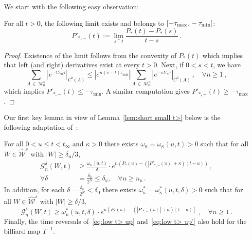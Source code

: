 \documentclass[AHL,Unicode,longabstracts,published]{cedram}
\newcommand{\cG}{\mathcal{G}}
\newcommand{\MM}{\mathcal{M}}
\newcommand{\cW}{\mathcal{W}}
\newcommand{\hW}{\widehat{\cW}}
\let\oldforall\forall
\renewcommand*{\forall}{\mathrel{\oldforall}}
\begin{document}
We start with the following easy observation:

\begin{lemm}\label{derP}
For all $t>0$,
the following limit exists and belongs to $ [-\tau_{\max},\newline-\tau_{\min}]$:
\[
P'_{*,-}(t):= \lim_{s \uparrow t} \frac{P_*(t)-P_*(s)}{t-s}\,.
\]
\end{lemm}

\begin{proof}
Existence of the limit follows from the convexity of $P_*(t)$
which implies that left (and right) derivatives exist at every $t>0$. Next, if $0<s<t$, we have
\begin{equation}\label{forconv}
\sum_{A\,\in\,\MM_0^n} \left|e^{-t\Sigma_n \tau}\right|_{C^0(A)}\le |e^{n(s-t)\tau_{\min}}|
\sum_{A\,\in\,\MM_0^n} \left|e^{-s\Sigma_n \tau}\right|_{C^0(A)}\,,\quad
\forall n \ge 1\,,
\end{equation}
which implies $P'_{*,-}(t)\le -\tau_{\min}$. A similar computation gives $P'_{*,-}(t)\ge -\tau_{\max}$.
\end{proof}



Our first key lemma in view of Lemma~\ref{lem:short small t>} below is the following adaptation of~\cite[Lemma~3.10]{BD2}:



\begin{lemm}\label{lem:low t>}
For all $0<u \le t< t_\infty$ and $\kappa>0$ there exists $\omega_\kappa =\omega_\kappa(u,t)>0$ such that for all $W \in \hW^s$ with $|W| \ge {\delta_{u}}/3$,
\begin{equation}\label{eq:low t> up}
\begin{split}
\cG_n^\delta(W,t)
&\ge \frac {\omega_\kappa(u,t)} \delta \cdot e^{n\left(P_*(u)-\left(\left| P'_{*,-}(u)\right| + \kappa\right)(t-u)\right)} \,, \\
\forall \delta &=\frac{\delta_0 }{2^{N}} \le \delta_{u}, \quad \forall n\ge n_{u}\,.
\end{split}
\end{equation}
In addition, for each $\delta =\frac{\delta_0}{ 2^N}<\delta_0$ there exists $\omega_\kappa^* =\omega_\kappa^*(u,t,\delta)>0$ such that for all $W \in \hW^s$ with $|W| \ge \delta/3$,
\begin{equation}\label{eq:low t> up'}
\cG_n^\delta(W,t)
\ge \omega_\kappa^*(u,t, \delta) \cdot e^{n\left(P_*(u)-\left(\left| P'_{*,-}(u)\right| + \kappa\right)(t-u)\right)} \,,\quad \forall n\ge 1 \,.
\end{equation}
Finally, the time reversals of~\eqref{eq:low t> up} and~\eqref{eq:low t> up'} also hold for the billiard map $T^{-1}$.
\end{lemm}
\end{document}
